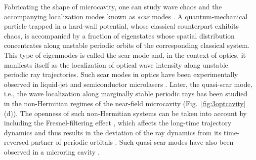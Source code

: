 \documentclass{tADP2e}
\theoremstyle{plain}
\theoremstyle{plain}
\theoremstyle{definition}
\begin{document}
\vspace{3pt}
\noindent
Fabricating the shape of microcavity, one can study wave chaos and the accompanying localization modes known as {\it scar} modes \cite{HEJ84}. A quantum-mechanical particle trapped in a hard-wall potential, whose classical counterpart exhibits chaos, is accompanied by a fraction of eigenstates whose spatial distribution concentrates along unstable periodic orbits of the corresponding classical system. This type of eigenmodes is called the scar mode and, in the context of optics, it manifests itself as the localization of optical wave intensity along unstable periodic ray trajectories. Such scar modes in optics have been experimentally observed in liquid-jet and semiconductor microlasers \cite{LSB02,RNB02,Gmachl:02}. Later, the quasi-scar mode, i.e., the wave localization along marginally stable periodic rays has been studied in the non-Hermitian regimes of the near-field microcavity \cite{WJ06,YCH11} (Fig.~\ref{fig:3optcavity}(d)). The openness of such non-Hermitian systems can be taken into account by including the Fresnel-filtering effect \cite{Tureci:02}, which affects the long-time trajectory dynamics and thus results in the deviation of the ray dynamics from its time-reversed partner of periodic orbitals \cite{Altmann_2008,SQH11,RB12}. Such quasi-scar modes have also been observed in a microring cavity \cite{LSY04}.
\end{document}

